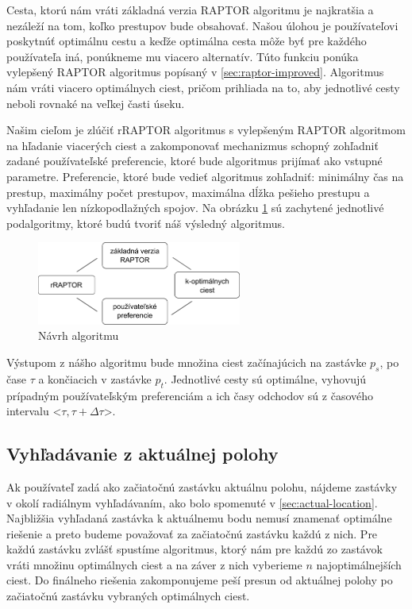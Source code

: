 Cesta, ktorú nám vráti základná verzia RAPTOR algoritmu je najkratšia a nezáleží na tom, koľko prestupov bude obsahovať. Našou úlohou je používateľovi poskytnúť optimálnu cestu a keďže optimálna cesta môže byť pre každého používateľa iná, ponúkneme mu viacero alternatív.  Túto funkciu ponúka vylepšený RAPTOR algoritmus popísaný v \ref{sec:raptor-improved}. Algoritmus nám vráti viacero optimálnych ciest, pričom prihliada na to, aby jednotlivé cesty neboli rovnaké na veľkej časti úseku.

Našim cieľom je zlúčiť rRAPTOR algoritmus s vylepšeným RAPTOR algoritmom na hľadanie viacerých ciest a zakomponovať mechanizmus schopný zohľadniť zadané používateľské preferencie, ktoré bude algoritmus prijímať ako vstupné parametre. Preferencie, ktoré bude vedieť algoritmus zohľadniť: minimálny čas na prestup, maximálny počet prestupov, maximálna dĺžka pešieho prestupu a vyhľadanie len nízkopodlažných spojov. Na obrázku \ref{fig:algorithm} sú zachytené jednotlivé podalgoritmy, ktoré budú tvoriť náš výsledný algoritmus.

\begin{figure}[H]
\centerline{\includegraphics[width=0.6\textwidth]{images/algorithm}}
\caption[Návrh algoritmu]{Návrh algoritmu}
\label{fig:algorithm}
\end{figure}

Výstupom z nášho algoritmu bude množina ciest začínajúcich na zastávke $p_s$, po čase $\tau$ a končiacich v zastávke $p_t$. Jednotlivé cesty sú optimálne, vyhovujú prípadným používateľským preferenciám a ich časy odchodov sú z časového intervalu <$\tau, \tau + \Delta \tau$>. 

\subsection{Vyhľadávanie z aktuálnej polohy}
Ak používateľ zadá ako začiatočnú zastávku aktuálnu polohu, nájdeme zastávky v okolí radiálnym vyhľadávaním, ako bolo spomenuté v \ref{sec:actual-location}. Najbližšia vyhľadaná zastávka k aktuálnemu bodu nemusí znamenať optimálne riešenie a preto budeme považovať za začiatočnú zastávku každú z nich. Pre každú zastávku zvlášť spustíme algoritmus, ktorý nám pre každú zo zastávok vráti množinu optimálnych ciest a na záver z nich vyberieme $n$ najoptimálnejších ciest. Do finálneho riešenia zakomponujeme peší presun od aktuálnej polohy po začiatočnú zastávku vybraných optimálnych ciest.

